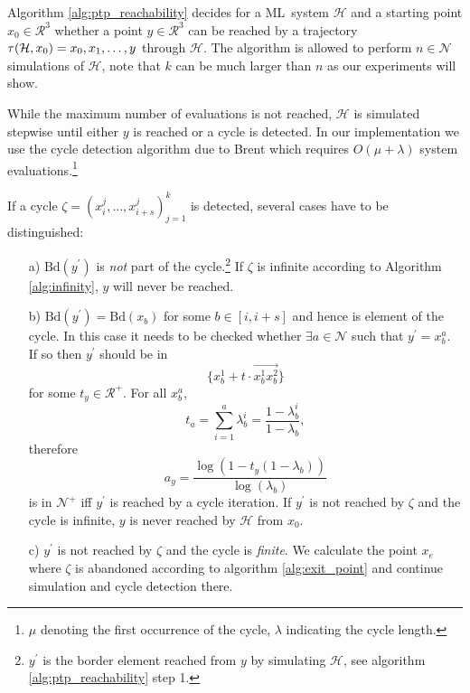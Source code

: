 \documentclass[copyright,creativecommons]{packages/eptcs}
\newcommand{\ml}{\mbox{ML}}
\newcommand{\bd}{{\mbox{Bd}}}
\newcommand{\traj}{\tau}
\newcommand{\cycle}{\zeta}
\begin{document}
Algorithm \ref{alg:ptp_reachability} decides for a \ml~system $\mathcal{H}$ and a starting point $x_0 \in \mathcal{R}^3$ whether a point $y \in \mathcal{R}^3$ can be reached by a trajectory $\traj({\cal H},x_0) = x_0,x_1, \dots, y$ through $\mathcal{H}$. The algorithm is allowed to perform $n \in \mathcal{N}$ simulations of $\mathcal{H}$, note that $k$ can be much larger than $n$ as our experiments will show.

While the maximum number of evaluations is not reached, $\mathcal{H}$ is simulated stepwise until either $y$ is reached or a cycle is detected. In our implementation we use the cycle detection algorithm due to Brent \cite{B80} which requires $O(\mu + \lambda)$ system evaluations.\footnote{$\mu$ denoting the first occurrence of the cycle, $\lambda$ indicating the cycle length.} 

If a cycle $\cycle=(x_{i}^j, \dots, x_{i+s}^j)_{j=1}^k$ is detected, several cases have to be distinguished: 

\begin{enumerate}

\item[a)] $\bd(y^\prime)$ is \emph{not} part of the cycle.\footnote{$y^\prime$ is the border element reached from $y$ by simulating $\mathcal{H}$, see algorithm \ref{alg:ptp_reachability} step 1.} If $\cycle$ is infinite according to Algorithm \ref{alg:infinity}, $y$ will never be reached. 

\item[b)]  $\bd(y^\prime) = \bd(x_b)$ for some $b \in [i, i+s]$ and hence is element of the cycle. In this case it needs to be checked whether $\exists a \in \mathcal{N}$ such that $y^\prime = x_b^a$. If so then $y^\prime$ should be in \[\{x_b^1 + t \cdot \overrightarrow{x_b^1x_b^2}\}\] for some $t_y \in \mathcal{R}^+$. For all $x_b^a$, \[t_a = \sum_{i = 1}^a \lambda_b^i = \frac{1-\lambda_b^i}{1-\lambda_b},\] therefore \[a_y = \frac{\log(1 - t_y(1 - \lambda_b))}{\log(\lambda_b)}\] is in $\mathcal{N}^+$ iff $y^\prime$ is reached by a cycle iteration. If $y^\prime$ is not reached by $\cycle$ and the cycle is infinite, $y$ is never reached by $\mathcal{H}$ from $x_0$.

\item[c)]  $y^\prime$ is not reached by $\cycle$ and the cycle is \emph{finite}. We calculate the point $x_e$ where $\cycle$ is abandoned according to algorithm \ref{alg:exit_point} and continue simulation and cycle detection there.

\end{enumerate}
\end{document}
